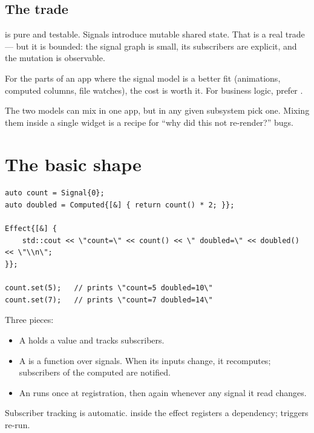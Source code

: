 \subsection*{The trade}

 is pure and testable. Signals introduce mutable
shared state. That is a real trade --- but it is bounded: the
signal graph is small, its subscribers are explicit, and the
mutation is observable.

For the parts of an app where the signal model is a better fit
(animations, computed columns, file watches), the cost is worth
it. For business logic, prefer .

\begin{warning}
The two models can mix in one app, but in any given subsystem
pick one. Mixing them inside a single widget is a recipe for
``why did this not re-render?'' bugs.
\end{warning}

\section{The basic shape}

\begin{lstlisting}
auto count = Signal{0};
auto doubled = Computed{[&] { return count() * 2; }};

Effect{[&] {
    std::cout << \"count=\" << count() << \" doubled=\" << doubled() << \"\\n\";
}};

count.set(5);   // prints \"count=5 doubled=10\"
count.set(7);   // prints \"count=7 doubled=14\"
\end{lstlisting}

Three pieces:

\begin{itemize}[leftmargin=*]
  \item A  holds a value and tracks subscribers.
  \item A  is a function over signals. When
    its inputs change, it recomputes; subscribers of the computed
    are notified.
  \item An  runs once at registration, then again
    whenever any signal it read changes.
\end{itemize}

Subscriber tracking is automatic.  inside the
effect registers a dependency;  triggers
re-run.

